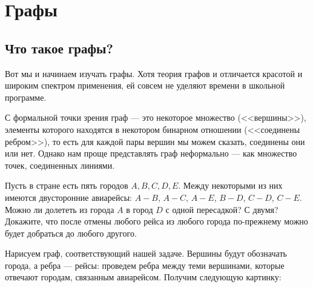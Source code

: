 \section{Графы}
\subsection{Что такое графы?}
Вот мы и начинаем изучать графы. Хотя теория графов и отличается
красотой и широким спектром применения, ей совсем не уделяют времени
в школьной программе.

С формальной точки зрения граф --- это некоторое множество 
(<<вершины>>), элементы которого находятся в некотором бинарном 
отношении (<<соединены ребром>>), то есть для каждой пары вершин мы 
можем сказать, соединены они или нет. Однако нам проще представлять
граф неформально --- как множество точек, соединенных линиями.

\begin{task}
    Пусть в стране есть пять городов $A, B, C, D, E$. Между некоторыми
    из них имеются двусторонние авиарейсы: $A-B$, $A-C$, $A-E$, $B-D$,
    $C-D$, $C-E$. Можно ли долететь из города $A$ в город $D$ с
    одной пересадкой? С двумя? Докажите, что после отмены любого
    рейса из любого города по-прежнему можно будет добраться до
    любого другого.
\end{task}

Нарисуем граф, соответствующий нашей задаче. Вершины будут обозначать
города, а ребра --- рейсы: проведем ребра между теми вершинами,
которые отвечают городам, связанным авиарейсом. Получим следующую
картинку:

\begin{center}
\end{center}

